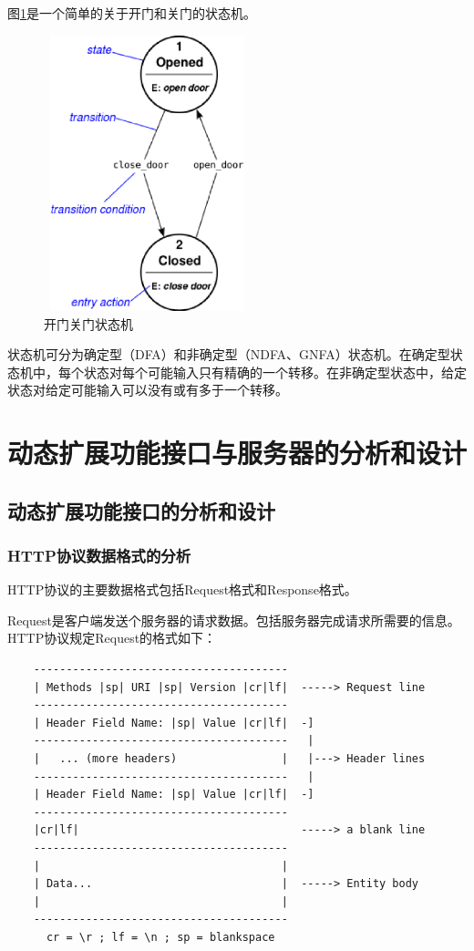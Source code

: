 \documentclass[12pt, twoside, a4paper, xetex]{report}
\begin{document}
	图\ref{fsm}是一个简单的关于开门和关门的状态机。
	
	\begin{figure}[t]
	\centering
	\caption{开门关门状态机}
	\label{fsm}
	\includegraphics[height=8cm, width=6cm]{pics/fsm.eps}
	\end{figure}
	
	状态机可分为确定型（DFA）和非确定型（NDFA、GNFA）状态机。在确定型状态机中，每个状态对每个可能输入只有精确的一个转移。在非确定型状态中，给定状态对给定可能输入可以没有或有多于一个转移。
	
\chapter{动态扩展功能接口与服务器的分析和设计}

\section{动态扩展功能接口的分析和设计}
\subsection{HTTP协议数据格式的分析}
	HTTP协议的主要数据格式包括Request格式和Response格式。
	
	Request是客户端发送个服务器的请求数据。包括服务器完成请求所需要的信息。HTTP协议规定Request的格式如下：
\begin{verbatim}
    ---------------------------------------
    | Methods |sp| URI |sp| Version |cr|lf|  -----> Request line
    ---------------------------------------
    | Header Field Name: |sp| Value |cr|lf|  -]
    ---------------------------------------   |
    |   ... (more headers)                |   |---> Header lines
    ---------------------------------------   |
    | Header Field Name: |sp| Value |cr|lf|  -]
    ---------------------------------------
    |cr|lf|                                  -----> a blank line
    ---------------------------------------
    |                                     |
    | Data...                             |  -----> Entity body
    |                                     |
    ---------------------------------------
      cr = \r ; lf = \n ; sp = blankspace
\end{verbatim}
 	
\end{document}
